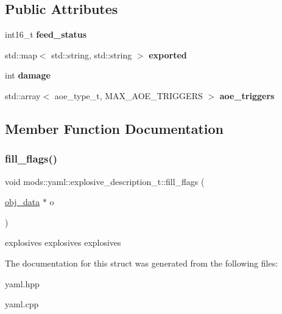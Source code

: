 \subsection*{Public Attributes}
\begin{DoxyCompactItemize}
\item 
\mbox{\label{structmods_1_1yaml_1_1explosive__description__t_ab3d36f50817bf1f8fb87f3a5efc29b4a}} 
int16\+\_\+t {\bfseries feed\+\_\+status}
\item 
\mbox{\label{structmods_1_1yaml_1_1explosive__description__t_a56e0e605333dce500cc5d8b8c6fbaa0a}} 
std\+::map$<$ std\+::string, std\+::string $>$ {\bfseries exported}
\item 
\mbox{\label{structmods_1_1yaml_1_1explosive__description__t_ae8c845495ada2726494212dc6b37e5dc}} 
int {\bfseries damage}
\item 
\mbox{\label{structmods_1_1yaml_1_1explosive__description__t_a455af5569bc77a846c05f28b057d295a}} 
std\+::array$<$ aoe\+\_\+type\+\_\+t, M\+A\+X\+\_\+\+A\+O\+E\+\_\+\+T\+R\+I\+G\+G\+E\+RS $>$ {\bfseries aoe\+\_\+triggers}
\end{DoxyCompactItemize}


\subsection{Member Function Documentation}
\mbox{\label{structmods_1_1yaml_1_1explosive__description__t_aae46a6116153a99335c13843f59ae63f}} 
\subsubsection{\texorpdfstring{fill\+\_\+flags()}{fill\_flags()}}
{\footnotesize\ttfamily void mods\+::yaml\+::explosive\+\_\+description\+\_\+t\+::fill\+\_\+flags (\begin{DoxyParamCaption}\item[{\hyperlink{structobj__data}{obj\+\_\+data} $\ast$}]{o }\end{DoxyParamCaption})}

explosives explosives explosives 

The documentation for this struct was generated from the following files\+:\begin{DoxyCompactItemize}
\item 
yaml.\+hpp\item 
yaml.\+cpp\end{DoxyCompactItemize}
